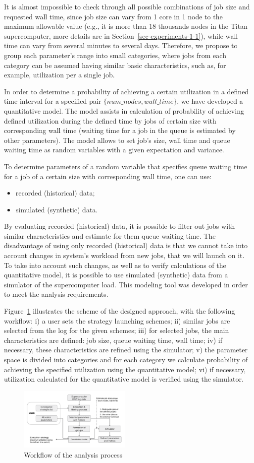 It is almost impossible to check through all possible combinations of job
size and requested wall time, since job size can vary from 1 core in 1 node
to the maximum allowable value (e.g., it is more than 18 thousands nodes in
the Titan supercomputer, more details are in Section~\ref{sec-experiments-1-1}),
while wall time can vary from several minutes to several days.
Therefore, we propose to group each parameter's range into small categories,
where jobs from each category can be assumed having similar basic
characteristics, such as, for example, utilization per a single job.

In order to determine a probability of achieving a certain utilization in a
defined time interval for a specified pair $\{num\_nodes, wall\_time\}$, we
have developed a quantitative model.
The model assists in calculation of probability of achieving defined utilization
during the defined time by jobs of certain size with corresponding wall time
(waiting time for a job in the queue is estimated by other parameters).
The model allows to set job's size, wall time and queue waiting time as random
variables with a given expectation and variance.

To determine parameters of a random variable that specifies queue waiting
time for a job of a certain size with corresponding wall time, one can use:
\begin{itemize}
    \item recorded (historical) data;
    \item simulated (synthetic) data.
\end{itemize}

By evaluating recorded (historical) data, it is possible to filter out jobs
with similar characteristics and estimate for them queue waiting time.
The disadvantage of using only recorded (historical) data is that we cannot take
into account changes in system's workload from new jobs, that we will launch
on it.
To take into account such changes, as well as to verify calculations of the
quantitative model, it is possible to use simulated (synthetic) data from a
simulator of the supercomputer load.
This modeling tool was developed in order to meet the analysis requirements.

Figure~\ref{fig-analysis-workflow} illustrates the scheme of the designed
approach, with the following workflow:
i) a user sets the strategy launching schemes;
ii) similar jobs are selected from the log for the given schemes;
iii) for selected jobs, the main characteristics are defined: job size, queue
waiting time, wall time;
iv) if necessary, these characteristics are refined using the simulator;
v) the parameter space is divided into categories and for each category we
calculate probability of achieving the specified utilization using the
quantitative model;
vi) if necessary, utilization calculated for the quantitative model is verified
using the simulator.

\begin{figure}
    \centering
    \includegraphics[width=0.48\textwidth]{pics/analysis-workflow.png}
    \caption{Workflow of the analysis process}
    \label{fig-analysis-workflow} 
\end{figure}
